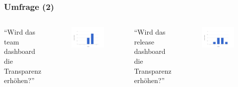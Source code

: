\documentclass{beamer}
\begin{document}
\begin{frame}
\frametitle{Umfrage (2)}
\begin{columns}
   ``Wird das team dashboard die Transparenz erh\"ohen?''
   \begin{figure}[h!]
    \centering
    \includegraphics[scale=0.3,keepaspectratio=true]{./halo2a.png}
   \end{figure}
   ``Wird das release dashboard die Transparenz erh\"ohen?''
   \begin{figure}[h!]
    \centering
    \includegraphics[scale=0.3,keepaspectratio=true]{./halo2d.png}
   \end{figure}
\end{columns}
\end{frame}
\end{document}
